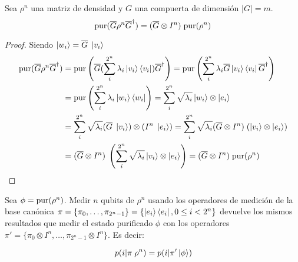 \begin{teorema}
\label{teo:pur_ev1}
Sea $\rho^n$ una matriz de densidad y $G$ una compuerta de dimensión $|G|=m$.
\begin{equation}
    \text{pur}(\overline{G}\rho^n \overline{G}^\dagger) = (\overline{G}\otimes I^n)\;\text{pur}(\rho^n)
\end{equation}
\end{teorema}
\begin{proof}
Siendo $\ket{w_i}=\overline{G}\;\ket{v_i}$
    \begin{align*}
        \text{pur}(\overline{G}\rho^n \overline{G}^\dagger) &= \text{pur}\left(\overline{G}(\sum_i^{2^n} \lambda_i \ket{v_i}\bra{v_i}) \overline{G}^\dagger\right) = \text{pur}\left(\sum_i^{2^n} \lambda_i \overline{G}\ket{v_i}\bra{v_i}\overline{G}^\dagger\right) \\
        &= \text{pur}\left(\sum_i^{2^n} \lambda_i \ket{w_i}\bra{w_i}\right) = \sum_i^{2^n} \sqrt{\lambda_i} \ket{w_i}\otimes \ket{e_i} \\
        &= \sum_i^{2^n} \sqrt{\lambda_i} (\overline{G} \;\ket{v_i})\otimes (I^n\;\ket{e_i}) = \sum_i^{2^n} \sqrt{\lambda_i} (\overline{G} \otimes I^n)\;(\ket{v_i} \otimes \ket{e_i}) \\
        &= (\overline{G} \otimes I^n)\;\left(\sum_i^{2^n} \sqrt{\lambda_i} \ket{v_i} \otimes \ket{e_i}\right) = (\overline{G} \otimes I^n)\;\text{pur}(\rho^n)
    \end{align*}
\end{proof}

    
\begin{teorema}
\label{teo:pur_meas1}
Sea $\phi = \text{pur}(\rho^n)$. Medir $n$ qubits de $\rho^n$ usando los operadores de medición de la base canónica $\pi = \{\pi_0, \dots, \pi_{2^n-1}\} = \{\ket{e_i}\bra{e_i}, 0\leq i < 2^n\}$ devuelve los mismos resultados que medir el estado purificado $\phi$ con los operadores $\pi' = \{\pi_0 \otimes I^n, \dots, \pi_{2^n-1} \otimes I^n\}$. Es decir:

\begin{equation*}
    p(i|\pi\;\rho^n) = p(i|\pi'\ket{\phi})
\end{equation*}

\end{teorema}

